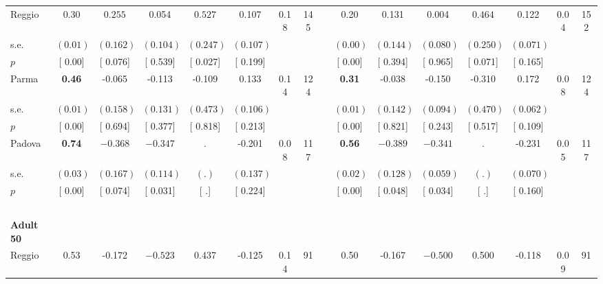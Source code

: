 \begin{longtable}{L{8em} c c c c c c c p{1em} c c c c c c c}
\quad \quad \quad Reggio& 0.30 & $ \mathbf{    0.255}$ &     0.054 & $ \mathbf{    0.527}$ &     0.107 &      0.18 &       145 & & 0.20 &     0.131 &     0.004 & $ \mathbf{    0.464}$ &     0.122 &      0.04 &       152  \\*
\quad \quad \quad \quad s.e.& $ (     0.01)$ & $ (    0.162)$ & $ (    0.104)$ & $ (    0.247)$ & $ (    0.107)$ & & & & $ (     0.00)$ & $ (    0.144)$ & $ (    0.080)$ & $ (    0.250)$ & $ (    0.071)$ & &  \\*
\quad \quad \quad \quad $ p$ & [     0.00] & [    0.076] & [    0.539] & [    0.027] & [    0.199] & & & & [     0.00] & [    0.394] & [    0.965] & [    0.071] & [    0.165] & &  \\[1em]
\quad \quad \quad Parma& \textbf{     0.46} &    -0.065 &    -0.113 &    -0.109 &     0.133 &      0.14 &       124 & & \textbf{     0.31} &    -0.038 &    -0.150 &    -0.310 &     0.172 &      0.08 &       124  \\*
\quad \quad \quad \quad s.e.& $ (     0.01)$ & $ (    0.158)$ & $ (    0.131)$ & $ (    0.473)$ & $ (    0.106)$ & & & & $ (     0.01)$ & $ (    0.142)$ & $ (    0.094)$ & $ (    0.470)$ & $ (    0.062)$ & &  \\*
\quad \quad \quad \quad $ p$ & [     0.00] & [    0.694] & [    0.377] & [    0.818] & [    0.213] & & & & [     0.00] & [    0.821] & [    0.243] & [    0.517] & [    0.109] & &  \\[1em]
\quad \quad \quad Padova& \textbf{     0.74} & $ \mathbf{   -0.368}$ & $ \mathbf{   -0.347}$ &         . &    -0.201 &      0.08 &       117 & & \textbf{     0.56} & $ \mathbf{   -0.389}$ & $ \mathbf{   -0.341}$ &         . &    -0.231 &      0.05 &       117  \\*
\quad \quad \quad \quad s.e.& $ (     0.03)$ & $ (    0.167)$ & $ (    0.114)$ & $ (        .)$ & $ (    0.137)$ & & & & $ (     0.02)$ & $ (    0.128)$ & $ (    0.059)$ & $ (        .)$ & $ (    0.070)$ & &  \\*
\quad \quad \quad \quad $ p$ & [     0.00] & [    0.074] & [    0.031] & [        .] & [    0.224] & & & & [     0.00] & [    0.048] & [    0.034] & [        .] & [    0.160] & &  \\[1em]
~\\[1em]
\quad \quad \textbf{Adult 50} & & & & & & & & & & & & & & & \\* 
\quad \quad \quad Reggio& 0.53 &    -0.172 & $ \mathbf{   -0.523}$ &     0.437 &    -0.125 &      0.14 &        91 & & 0.50 &    -0.167 & $ \mathbf{   -0.500}$ &     0.500 &    -0.118 &      0.09 &        91  \\*

\end{longtable}
